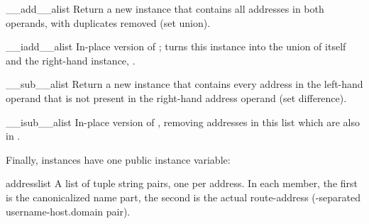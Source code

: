 \begin{methoddesc}{__add__}{alist}
Return a new  instance that contains all addresses
in both  operands, with duplicates removed (set
union).
\end{methoddesc}

\begin{methoddesc}{__iadd__}{alist}
In-place version of ; turns this 
instance into the union of itself and the right-hand instance,
.
\end{methoddesc}

\begin{methoddesc}{__sub__}{alist}
Return a new  instance that contains every address
in the left-hand  operand that is not present in
the right-hand address operand (set difference).
\end{methoddesc}

\begin{methoddesc}{__isub__}{alist}
In-place version of , removing addresses in this
list which are also in .
\end{methoddesc}


Finally,  instances have one public instance variable:

\begin{memberdesc}{addresslist}
A list of tuple string pairs, one per address.  In each member, the
first is the canonicalized name part, the second is the
actual route-address (-separated username-host.domain
pair).
\end{memberdesc}
